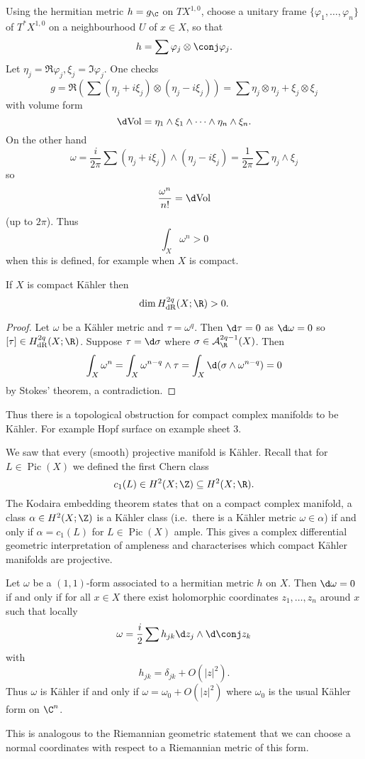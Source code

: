 \documentclass[a4paper]{article}
\newcommand{\w}{\wedge} %
\DeclareMathOperator{\Pic}{Pic} %
\begin{document}
Using the hermitian metric \(h = g_\C\) on \(TX^{1, 0}\), choose a unitary frame \(\{\varphi_1, \dots, \varphi_n\}\) of \(T^*X^{1, 0}\) on a neighbourhood \(U\) of \(x \in X\), so that
\[
  h = \sum \varphi_j \otimes \conj \varphi_j.
\]
Let \(\eta_j = \Re \varphi_j, \xi_j = \Im \varphi_j\). One checks
\[
  g
  = \Re (\sum (\eta_j + i \xi_j) \otimes (\eta_j - i \xi_j))
  = \sum \eta_j \otimes \eta_j + \xi_j \otimes \xi_j
\]
with volume form
\[
  \d \text{Vol} = \eta_1 \w \xi_1 \w \cdots \w \eta_n \w \xi_n.
\]
On the other hand
\[
  \omega
  = \frac{i}{2\pi} \sum (\eta_j + i \xi_j) \w (\eta_j - i \xi_j)
  = \frac{1}{2\pi} \sum \eta_j \w \xi_j
\]
so
\[
  \frac{\omega^n}{n!} = \d \text{Vol}
\]
(up to \(2\pi\)). Thus
\[
  \int_X \omega^n > 0
\]
when this is defined, for example when \(X\) is compact.

\begin{proposition}
  If \(X\) is compact Kähler then
  \[
    \dim H^{2q}_{\text{dR}} (X; \R) > 0.
  \]
\end{proposition}

\begin{proof}
  Let \(\omega\) be a Kähler metric and \(\tau = \omega^q\). Then \(\d \tau = 0\) as \(\d \omega = 0\) so \([\tau] \in H^{2q}_{\text{dR}} (X; \R)\). Suppose \(\tau = \d \sigma\) where \(\sigma \in \mathcal A^{2q - 1}_\R(X)\). Then
  \[
    \int_X \omega^n
    = \int_X \omega^{n - q} \w \tau
    = \int_X \d (\sigma \w \omega^{n - q})
    = 0
  \]
  by Stokes' theorem, a contradiction.
\end{proof}

Thus there is a topological obstruction for compact complex manifolds to be Kähler. For example Hopf surface on example sheet 3.

\begin{remark}
  We saw that every (smooth) projective manifold is Kähler. Recall that for \(L \in \Pic(X)\) we defined the first Chern class
  \[
    c_1(L) \in H^2(X; \Z) \subseteq H^2(X; \R).
  \]
  The Kodaira embedding theorem states that on a compact complex manifold, a class \(\alpha \in H^2(X; \Z)\) is a Kähler class (i.e.\ there is a Kähler metric \(\omega \in \alpha\)) if and only if \(\alpha = c_1(L)\) for \(L \in \Pic(X)\) ample. This gives a complex differential geometric interpretation of ampleness and characterises which compact Kähler manifolds are projective.
\end{remark}

\begin{proposition}
  Let \(\omega\) be a \((1, 1)\)-form associated to a hermitian metric \(h\) on \(X\). Then \(\d \omega = 0\) if and only if for all \(x \in X\) there exist holomorphic coordinates \(z_1, \dots, z_n\) around \(x\) such that locally
  \[
    \omega = \frac{i}{2} \sum h_{jk} \d z_j \w \d \conj z_k
  \]
  with
  \[
    h_{jk} = \delta_{jk} + O(|z|^2).
  \]
  Thus \(\omega\) is Kähler if and only if \(\omega = \omega_0 + O(|z|^2)\) where \(\omega_0\) is the usual Kähler form on \(\C^n\).
\end{proposition}
This is analogous to the Riemannian geometric statement that we can choose a normal coordinates with respect to a Riemannian metric of this form.
\end{document}
